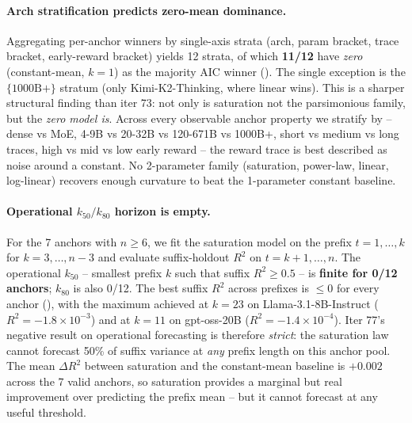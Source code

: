 \paragraph{Arch stratification predicts zero-mean dominance.}
\label{par:scaling-iter81-stratum}
Aggregating per-anchor winners by single-axis strata (arch, param
bracket, trace bracket, early-reward bracket) yields 12 strata, of
which \textbf{11/12} have \emph{zero} (constant-mean, $k=1$) as the
majority AIC winner ().  The single
exception is the $\{1000\mathrm{B}+\}$ stratum (only Kimi-K2-Thinking,
where linear wins).  This is a sharper structural finding than iter
73: not only is saturation not the parsimonious family, but the
\emph{zero model is}.  Across every observable anchor property we
stratify by -- dense vs MoE, 4-9B vs 20-32B vs 120-671B vs 1000B+,
short vs medium vs long traces, high vs mid vs low early reward --
the reward trace is best described as noise around a constant.
No 2-parameter family (saturation, power-law, linear, log-linear)
recovers enough curvature to beat the 1-parameter constant baseline.

\paragraph{Operational $k_{50}/k_{80}$ horizon is empty.}
\label{par:scaling-iter81-horizon}
For the 7 anchors with $n \ge 6$, we fit the saturation model on the
prefix $t = 1, \dots, k$ for $k = 3, \dots, n-3$ and evaluate
suffix-holdout $R^2$ on $t = k+1, \dots, n$.  The operational
$k_{50}$ -- smallest prefix $k$ such that suffix $R^2 \ge 0.5$ -- is
\textbf{finite for 0/12 anchors}; $k_{80}$ is also 0/12.  The best
suffix $R^2$ across prefixes is $\le 0$ for every anchor
(), with the maximum achieved at $k=23$
on Llama-3.1-8B-Instruct ($R^2 = -1.8 \times 10^{-3}$) and at $k=11$
on gpt-oss-20B ($R^2 = -1.4 \times 10^{-4}$).  Iter 77's negative
result on operational forecasting is therefore \emph{strict}: the
saturation law cannot forecast 50\% of suffix variance at \emph{any}
prefix length on this anchor pool.  The mean $\Delta R^2$ between
saturation and the constant-mean baseline is $+0.002$ across the 7
valid anchors, so saturation provides a marginal but real improvement
over predicting the prefix mean -- but it cannot forecast at any
useful threshold.

